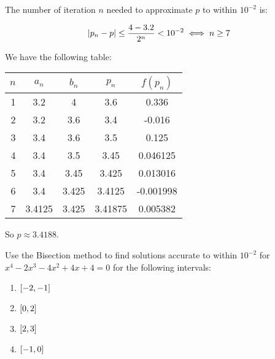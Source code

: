 \documentclass[../../Assignments.tex]{subfiles}
\begin{document}
\begin{solution}
\begin{enumerate}[label=(\alph*)]
            The number of iteration \(n\) needed to approximate \(p\) to within
            \(10^{-2}\) is:

            \[\abs{p_n - p} \leq \frac{4 - \num{3.2}}{2^n} < 10^{-2} \iff n \geq 7\]

            We have the following table:

            \begin{table}[hbt!]
                \centering
                \begin{tabular}{r S[table-format=1.5] S[table-format=1.6] S[table-format=1.6] S[table-format=-1.6]}
                    \toprule
                    \(n\)  &  {\(a_n\)}  &  {\(b_n\)}  &  {\(p_n\)}  &  {\(f(p_n)\)}  \\
                      &  3.2        &  4          &  3.6        &   0.336        \\
                        2  &  3.2        &  3.6        &  3.4        &  -0.016        \\
                        3  &  3.4        &  3.6        &  3.5        &   0.125        \\
                        4  &  3.4        &  3.5        &  3.45       &   0.046125     \\
                        5  &  3.4        &  3.45       &  3.425      &   0.013016     \\
                        6  &  3.4        &  3.425      &  3.4125     &  -0.001998     \\
                        7  &  3.4125     &  3.425      &  3.41875    &   0.005382     \\
                    \bottomrule
                \end{tabular}
            \end{table}

            So \(p \approx \num{3.4188}\).
    \end{enumerate}
\end{solution}

\begin{exercise}
    Use the Bisection method to find solutions accurate to within \(10^{-2}\)
    for \(x^4 - 2x^3 - 4x^2 + 4x + 4 = 0\) for the following intervals:

    \begin{enumerate}[label=(\alph*)]
        \item \(\interval{-2}{-1}\)
        \item \(\interval{0}{2}\)
        \item \(\interval{2}{3}\)
        \item \(\interval{-1}{0}\)
    \end{enumerate}
\end{exercise}
\end{document}
